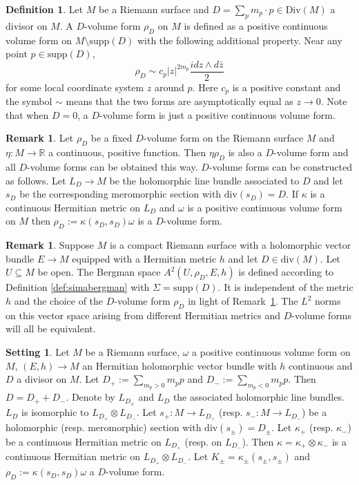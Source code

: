 \documentclass[11pt]{amsart}
\theoremstyle{definition}
\newtheorem{setting}[theorem]{Setting}
\newtheorem{definition}[theorem]{Definition}
\newtheorem{remark}[theorem]{Remark}
\begin{document}
\begin{definition}\label{def:gyokosmetrika}
    Let $M$ be a Riemann surface and    $D = \sum_pm_p\cdot p \in \text{Div}(M)$ a divisor on $M$. A $D$-volume form $\rho_D$  on $M$ is defined as a positive continuous volume form on $M\setminus\text{supp}(D)$ with the following additional property. Near any point $p \in \text{supp}(D)$, $$\rho_D \sim c_p|z|^{2m_p}\frac{idz\wedge d\bar z}{2}$$ for some local coordinate system $z$ around $p$. Here $c_p$ is a positive constant and the symbol $\sim$ means that the two forms are asymptotically equal as $z \to 0$. Note that when $D=0$, a $D$-volume form is just a positive continuous volume form.
\end{definition}
\begin{remark}\label{rem:D-volume}
Let $\rho_D$ be a fixed $D$-volume form on the Riemann surface $M$ and $\eta:M\rightarrow\mathbb R$ a continuous, positive  function. Then $\eta\rho_D$ is also  a $D$-volume form and all $D$-volume forms can be obtained  this way. $D$-volume forms can be constructed as follows. 
 Let  $L_D\rightarrow M$ be the  holomorphic line bundle associated to $D$ and let $s_D$ be the corresponding meromorphic section with $\text{div} (s_D)=D$.
If $\kappa$ is a continuous Hermitian metric on $L_D$ 
 and $\omega$ is a positive continuous volume form on $M$ then $\rho_D:=\kappa(s_D,s_D)\omega$ is a $D$-volume form.
 
\end{remark}    

\begin{remark}\label{rem:rhoindep}
Suppose $M$ is a compact Riemann surface with a holomorphic vector bundle 
$E\rightarrow M$ equipped with a Hermitian metric $h$ and let $D \in \text{div}(M)$. Let $U \subseteq M$ be open. The Bergman space $A^2(U,\rho_D,E,h)$ is defined according to Definition \ref{def:simabergman} with $\Sigma = \text{supp}(D)$. It is independent of the metric $h$ and the choice of the $D$-volume form $\rho_D$ in light of Remark~\ref{rem:D-volume}. The  $L^2$ norms on this vector space arising from different Hermitian metrics and $D$-volume forms will all be equivalent. 
\end{remark}


\begin{setting}\label{S:input}
 Let $M$ be a Riemann surface, $\omega$ a positive continuous volume form on $M$,
 $(E,h)\rightarrow M$ an Hermitian holomorphic vector bundle with $h$ continuous and
 $D$ a divisor on $M$. Let
$D_+:=\sum_{m_p>0}m_pp$ and  
  $D_-:=\sum_{m_p<0}m_pp$.
    Then $D=D_++D_-$. Denote by  $L_{D_\pm}$ and  $L_D$ the associated holomorphic line bundles.  $L_D$
    is isomorphic to $L_{D_+}\otimes L_{D_-}$. Let $s_+:M\rightarrow L_{D_+}$ (resp. $s_-:M\rightarrow L_{D_-}$) be a holomorphic (resp. meromorphic) section with $\text{div}(s_\pm)=D_\pm$.
    Let $\kappa_+$ (resp. $\kappa_-$) be a continuous Hermitian  metric on $L_{D_+}$ (resp. on $L_{D_-}$).
    Then $\kappa=\kappa_+\otimes \kappa_-$ is a continuous Hermitian metric on $L_{D_+}\otimes L_{D_-}$.
     Let $K_\pm=\kappa_\pm(s_\pm,s_\pm)$ and
     $\rho_D:=\kappa(s_D,s_D)\omega$  a $D$-volume form.  
\end{setting}
\end{document}
